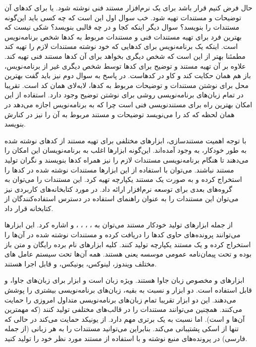 حال فرض کنیم قرار باشد برای یک نرم‌افزار مستند فنی نوشته شود. یا برای کدهای آن
توضیحات و مستندات تهیه شود.
خب سوال اول این است که چه کسی باید این‌گونه مستندات را بنویسد؟ سوال دیگر اینکه
کجا و در چه قالبی بنویسد؟ شکی نیست که بهترین فرد برای تهیه مستندات فنی و مستندات
مربوط به کدها شخص برنامه‌نویس است. اینکه یک برنامه‌نویس برای کدهایی که خود نوشته
مستندات لازم را تهیه کند مطمئنا بهتر از این است که شخص دیگری بخواهد برای آن کدها
مستند فنی تهیه کند. علاوه بر آن تهیه مستند و توضیح برای کدها توسط شخص دیگری غیر
از برنامه‌نویس، باز هم همان حکایت کند و کاو در کدهاست. در پاسخ به سوال دوم نیز
باید گفت بهترین محل برای نوشتن مستندات و توضیحات مربوط به کدها، لابه‌لای همان کد
است. تقریبا در تمام زبان‌های برنامه‌نویسی روشی برای نوشتن توضیح وجود دارد.
استفاده از این امکان بهترین راه برای مستندنویسی فنی است چرا که به برنامه‌نویس
اجازه می‌دهد در همان لحظه که کد را می‌نویسد توضیحات و مستند مربوط به آن را نیز
در کنارش بنویسد.


با توجه اهمیت مستندسازی، ابزارهای مختلفی برای تهیه مستند از کدهای نوشته شده به
طور خودکار، به وجود آمده‌اند. این‌گونه ابزارها اغلب به برنامه‌نویسان این امکان
را می‌دهند تا هنگام برنامه‌نویسی مستندات لازم را نیز همراه کدها بنویسند و نگران
تولید مستند نباشند. می‌توان با استفاده از این ابزارها مستندات نوشته شده در کدها
را استخراج کرده و به صورت یک مستند یکپارچه تهیه کرد. این مستندات را می‌توان به
گروه‌های بعدی برای توسعه نرم‌افزار ارائه داد. در مورد کتابخانه‌های کاربردی نیز
می‌توان این مستندات را به عنوان راهنمای استفاده در دسترس استفاده‌کنندگان از
کتابخانه قرار داد.

\begin{sloppypar}
از جمله ابزارهای تولید خودکار مستند می‌توان به 
، ، ، ،  و  
اشاره کرد. این ابزارها می‌توانند پرونده‌های حاوی کدها را دریافت کرده و مستندات نوشته شده در آن‌ها 
را استخراج کرده و یک مستند یکپارچه تولید کنند. کلیه ابزارهای نام برده رایگان و متن باز بوده و 
تحت پیمان‌نامه عمومی موسسه  یعنی  هستند. 
همه آن‌ها تحت سیستم عامل های مختلف ویندوز، لینوکس، یونیکس،  و  قابل اجرا هستند. 
\end{sloppypar}

ابزارهای  و  مخصوص زبان جاوا هستند.  ویژه
زبان  است و ابزار  برای زبان‌های جاوا،  و 
قابل استفاده است. دو ابزار  و  نسبت به بقیه، زبان‌های
برنامه‌نویسی بیشتری را پوشش می‌دهند. این دو ابزار تقریبا تمام زبان‌های
برنامه‌نویسی متداول امروزی را حمایت می‌کنند. همچنین می‌توانند مستندات را در
قالب‌های مختلفی تولید کنند (که مهمترین آن‌ها  و  است).
اما  نسبت به  یک برتری مهم دارد.  از یونیکد
حمایت می‌کند در حالی که  تنها از اسکی پشتیبانی می‌کند. بنابراین 
می‌توانید مستندات را به هر زبانی (از جمله فارسی) در پرونده‌های منبع نوشته و با
استفاده از  مستند مورد نظر خود را تولید کنید.

